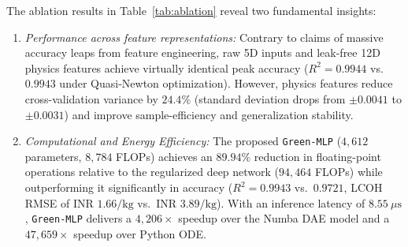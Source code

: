\documentclass[conference]{IEEEtran}
\begin{document}
The ablation results in Table~\ref{tab:ablation} reveal two fundamental insights:
\begin{enumerate}
    \item \textit{Performance across feature representations:} Contrary to claims of massive accuracy leaps from feature engineering, raw 5D inputs and leak-free 12D physics features achieve virtually identical peak accuracy ($R^2 = 0.9944$ vs.\ $0.9943$ under Quasi-Newton optimization). However, physics features reduce cross-validation variance by $24.4\%$ (standard deviation drops from $\pm 0.0041$ to $\pm 0.0031$) and improve sample-efficiency and generalization stability.
    \item \textit{Computational and Energy Efficiency:} The proposed \texttt{Green-MLP} ($4,612$ parameters, $8,784$ FLOPs) achieves an $89.94\%$ reduction in floating-point operations relative to the regularized deep network ($94,464$ FLOPs) while outperforming it significantly in accuracy ($R^2 = 0.9943$ vs.\ $0.9721$, LCOH RMSE of $\text{INR } 1.66/\text{kg}$ vs.\ $\text{INR } 3.89/\text{kg}$). With an inference latency of $8.55\ \mu\text{s}$, \texttt{Green-MLP} delivers a $4,206\times$ speedup over the Numba DAE model and a $47,659\times$ speedup over Python ODE.


\end{enumerate}
\end{document}
